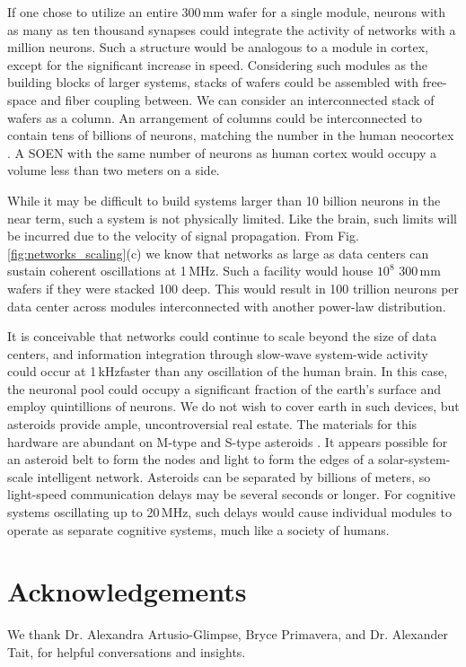\documentclass[aip,amsmath,amssymb,reprint,nofootinbib]{revtex4-1}
\begin{document}
If one chose to utilize an entire 300\,mm wafer for a single module, neurons with as many as ten thousand synapses could integrate the activity of networks with a million neurons. Such a structure would be analogous to a module in cortex, except for the significant increase in speed. Considering such modules as the building blocks of larger systems, stacks of wafers could be assembled with free-space and fiber coupling between. We can consider an interconnected stack of wafers as a column. An arrangement of columns could be interconnected to contain tens of billions of neurons, matching the number in the human neocortex \cite{brsc1998,he2009}. A SOEN with the same number of neurons as human cortex would occupy a volume less than two meters on a side. 

While it may be difficult to build systems larger than 10 billion neurons in the near term, such a system is not physically limited. Like the brain, such limits will be incurred due to the velocity of signal propagation. From Fig.\,\ref{fig:networks_scaling}(c) we know that networks as large as data centers can sustain coherent oscillations at 1\,MHz. Such a facility would house $10^8$ 300\,mm wafers if they were stacked 100 deep. This would result in 100 trillion neurons per data center across modules interconnected with another power-law distribution. 

It is conceivable that networks could continue to scale beyond the size of data centers, and information integration through slow-wave system-wide activity could occur at 1\,kHz\textemdash faster than any oscillation of the human brain. In this case, the neuronal pool could occupy a significant fraction of the earth's surface and employ quintillions of neurons. We do not wish to cover earth in such devices, but asteroids provide ample, uncontroversial real estate. The materials for this hardware are abundant on M-type and S-type asteroids \cite{mufo2017,astra,bu1999,shcl2010,necl2014}. It appears possible for an asteroid belt to form the nodes and light to form the edges of a solar-system-scale intelligent network. Asteroids can be separated by billions of meters, so light-speed communication delays may be several seconds or longer. For cognitive systems oscillating up to 20\,MHz, such delays would cause individual modules to operate as separate cognitive systems, much like a society of humans. 

\section{Acknowledgements}
We thank Dr. Alexandra Artusio-Glimpse, Bryce Primavera, and Dr. Alexander Tait, for helpful conversations and insights.
\end{document}
